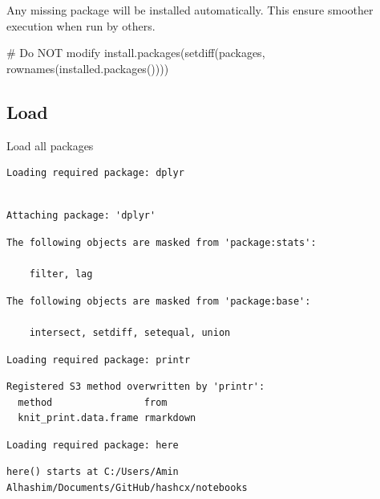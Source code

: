 \documentclass[
  letterpaper,
  DIV=11,
  numbers=noendperiod]{scrreprt}
\newenvironment{Shaded}{\begin{snugshade}}{\end{snugshade}}
\newcommand{\CommentTok}[1]{\textcolor[rgb]{0.37,0.37,0.37}{#1}}
\newcommand{\FunctionTok}[1]{\textcolor[rgb]{0.28,0.35,0.67}{#1}}
\newcommand{\NormalTok}[1]{\textcolor[rgb]{0.00,0.23,0.31}{#1}}
\begin{document}
Any missing package will be installed automatically. This ensure
smoother execution when run by others.

\begin{Shaded}
\begin{Highlighting}[]
\CommentTok{\# Do NOT modify}
\FunctionTok{install.packages}\NormalTok{(}\FunctionTok{setdiff}\NormalTok{(packages, }\FunctionTok{rownames}\NormalTok{(}\FunctionTok{installed.packages}\NormalTok{())))}
\end{Highlighting}
\end{Shaded}

\subsection{Load}\label{load-1}

Load all packages

\begin{verbatim}
Loading required package: dplyr
\end{verbatim}

\begin{verbatim}

Attaching package: 'dplyr'
\end{verbatim}

\begin{verbatim}
The following objects are masked from 'package:stats':

    filter, lag
\end{verbatim}

\begin{verbatim}
The following objects are masked from 'package:base':

    intersect, setdiff, setequal, union
\end{verbatim}

\begin{verbatim}
Loading required package: printr
\end{verbatim}

\begin{verbatim}
Registered S3 method overwritten by 'printr':
  method                from     
  knit_print.data.frame rmarkdown
\end{verbatim}

\begin{verbatim}
Loading required package: here
\end{verbatim}

\begin{verbatim}
here() starts at C:/Users/Amin Alhashim/Documents/GitHub/hashcx/notebooks
\end{verbatim}
\end{document}
